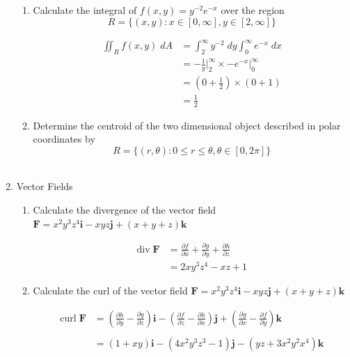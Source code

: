 \documentclass[a4paper,11pt]{article}
\begin{document}
\begin{preview}
\begin{enumerate}
\begin{enumerate}
    \item Calculate the integral of $f(x,y) = y^{-2}e^{-x}$ over the region
    $$ R = \{ (x,y): x \in [0,\infty], y \in [2,\infty]\} $$

    \begin{align*}
        \iint_R f(x,y) \; dA &= \int_{2}^{\infty} y^{-2} \;dy \int_{0}^{\infty} e^{-x} \;dx\\
        &= -\frac{1}{y}\Big|_{2}^{\infty}  \times -e^{-x}\Big|_{0}^{\infty} \\
        &= \left( 0 + \frac{1}{2} \right) \times \left( 0 + 1 \right)\\
        &= \frac{1}{2}
    \end{align*}

    \item Determine the centroid of the two dimensional object described in polar coordinates by
    $$ R = \{ (r, \theta): 0 \leq r \leq \theta, \theta \in [0, 2\pi] \} $$\\

\end{enumerate}

\item Vector Fields

\begin{enumerate}
    \item Calculate the divergence of the vector field $\textbf{F} = x^2y^3z^4 \textbf{i} - xyz \textbf{j} + (x+y+z) \textbf{k}$
    
    \begin{align*}
        \mathrm{div} \; \textbf{F} &= \frac{\partial f}{\partial x } + \frac{\partial g}{\partial y } + \frac{\partial h}{\partial z }\\
        &= 2xy^3z^4 - xz + 1
    \end{align*}

    \item Calculate the curl of the vector field $\textbf{F} = x^2y^3z^4 \textbf{i} - xyz \textbf{j} + (x+y+z) \textbf{k}$
    
    \begin{align*}
        \mathrm{curl} \; \textbf{F} &= \left( \frac{\partial h}{\partial y} - \frac{\partial g}{\partial z} \right) \textbf{i} - \left( \frac{\partial f}{\partial z} - \frac{\partial h}{\partial x} \right) \textbf{j} + \left( \frac{\partial g}{\partial x} - \frac{\partial f}{\partial y} \right) \textbf{k}\\\\
        &= \left( 1 + xy \right) \textbf{i} - \left( 4x^2y^3z^3 - 1 \right) \textbf{j} - \left( yz + 3x^2y^2x^4 \right) \textbf{k}\\
    \end{align*}


\end{enumerate}
\end{enumerate}
\end{preview}
\end{document}
